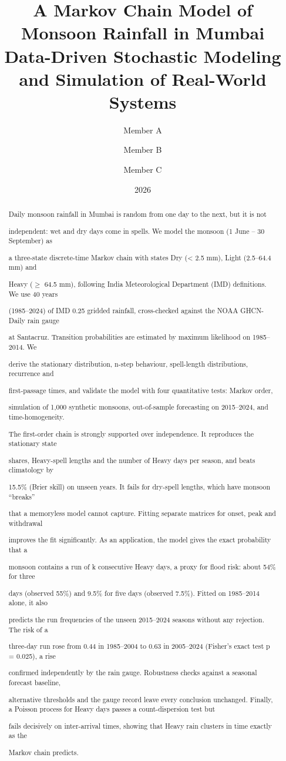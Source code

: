 \documentclass[11pt,a4paper]{article}
\title{\textbf{A Markov Chain Model of Monsoon Rainfall in Mumbai}\\[4pt]
  \large Data-Driven Stochastic Modeling and Simulation of Real-World Systems}
\author{Member A \and Member B \and Member C}  %
\date{2026}
\begin{document}
\maketitle
\begin{abstract}
Daily monsoon rainfall in Mumbai is random from one day to the next, but it is not

independent: wet and dry days come in spells. We model the monsoon (1 June -- 30 September) as

a three-state discrete-time Markov chain with states Dry (\textless{} 2.5 mm), Light (2.5--64.4 mm) and

Heavy ($\geq$ 64.5 mm), following India Meteorological Department (IMD) definitions. We use 40 years

(1985--2024) of IMD 0.25\textdegree{} gridded rainfall, cross-checked against the NOAA GHCN-Daily rain gauge

at Santacruz. Transition probabilities are estimated by maximum likelihood on 1985--2014. We

derive the stationary distribution, n-step behaviour, spell-length distributions, recurrence and

first-passage times, and validate the model with four quantitative tests: Markov order,

simulation of 1,000 synthetic monsoons, out-of-sample forecasting on 2015--2024, and time-homogeneity.

The first-order chain is strongly supported over independence. It reproduces the stationary state

shares, Heavy-spell lengths and the number of Heavy days per season, and beats climatology by

15.5\% (Brier skill) on unseen years. It fails for dry-spell lengths, which have monsoon ``breaks''

that a memoryless model cannot capture. Fitting separate matrices for onset, peak and withdrawal

improves the fit significantly. As an application, the model gives the exact probability that a

monsoon contains a run of k consecutive Heavy days, a proxy for flood risk: about 54\% for three

days (observed 55\%) and 9.5\% for five days (observed 7.5\%). Fitted on 1985--2014 alone, it also

predicts the run frequencies of the unseen 2015--2024 seasons without any rejection. The risk of a

three-day run rose from 0.44 in 1985--2004 to 0.63 in 2005--2024 (Fisher's exact test p = 0.025), a rise

confirmed independently by the rain gauge. Robustness checks against a seasonal forecast baseline,

alternative thresholds and the gauge record leave every conclusion unchanged. Finally, a Poisson process for Heavy days passes a count-dispersion test but

fails decisively on inter-arrival times, showing that Heavy rain clusters in time exactly as the

Markov chain predicts.


\end{abstract}
\end{document}
